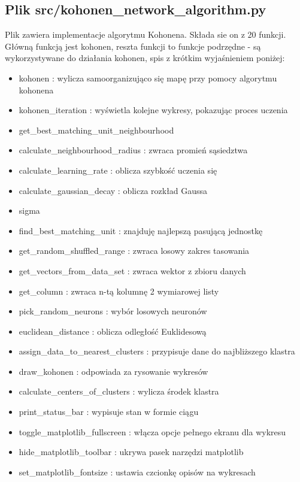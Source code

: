 \documentclass{classrep}
\begin{document}
{        \subsection{Plik src/kohonen\_network\_algorithm.py}
        {
            Plik zawiera implementacje algorytmu Kohonena. Składa sie on z 20 funkcji. Główną funkcją jest kohonen, reszta
            funkcji to funkcje podrzędne - są wykorzystywane do działania kohonen, spis z krótkim wyjaśnieniem poniżej:
            \begin{itemize}
                \item kohonen : wylicza samoorganizująco się mapę przy pomocy algorytmu kohonena
                \item kohonen\_iteration : wyświetla kolejne wykresy, pokazując proces uczenia
                \item get\_best\_matching\_unit\_neighbourhood
                \item calculate\_neighbourhood\_radius : zwraca promień sąsiedztwa
                \item calculate\_learning\_rate : oblicza szybkość uczenia się
                \item calculate\_gaussian\_decay : oblicza rozkład Gaussa
                \item sigma
                \item find\_best\_matching\_unit : znajduję najlepszą pasującą jednostkę
                \item get\_random\_shuffled\_range : zwraca losowy zakres tasowania
                \item get\_vectors\_from\_data\_set : zwraca wektor z zbioru danych
                \item get\_column : zwraca n-tą kolumnę 2 wymiarowej listy
                \item pick\_random\_neurons : wybór losowych neuronów
                \item euclidean\_distance : oblicza odległość Euklidesową
                \item assign\_data\_to\_nearest\_clusters : przypisuje dane do najbliższego klastra
                \item draw\_kohonen : odpowiada za rysowanie wykresów
                \item calculate\_centers\_of\_clusters : wylicza środek klastra
                \item print\_status\_bar : wypisuje stan w formie ciągu
                \item toggle\_matplotlib\_fullscreen : włącza opcje pełnego ekranu dla wykresu
                \item hide\_matplotlib\_toolbar : ukrywa pasek narzędzi matplotlib
                \item set\_matplotlib\_fontsize : ustawia czcionkę opisów na wykresach
            \end{itemize}
        }

}
\end{document}
